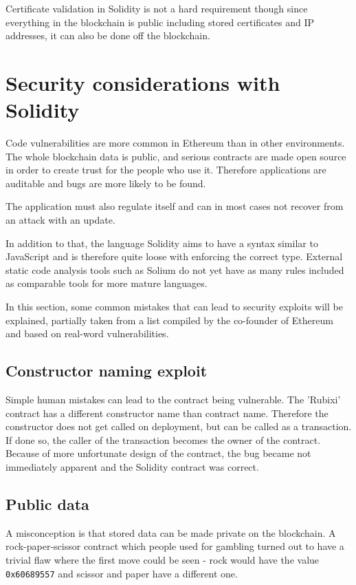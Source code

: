 Certificate validation in Solidity is not a hard requirement though \textemdash{} since everything in the blockchain is public including stored certificates and IP addresses, it can also be done off the blockchain. 

\section{Security considerations with Solidity}
Code vulnerabilities are more common in Ethereum than in other environments. The whole blockchain data is public, and serious contracts are made open source in order to create trust for the people who use it. Therefore applications are auditable and bugs are more likely to be found.

The application must also regulate itself and can in most cases not recover from an attack with an update.

In addition to that, the language Solidity aims to have a syntax similar to JavaScript and is therefore quite loose with enforcing the correct type. External static code analysis tools such as Solium \cite{Solium} do not yet have as many rules included as comparable tools for more mature languages.

In this section, some common mistakes that can lead to security exploits will be explained, partially taken from a list compiled by the co-founder of Ethereum \cite{ThinkingAboutSmartContractSecurity} and based on real-word vulnerabilities.

\subsection{Constructor naming exploit}
Simple human mistakes can lead to the contract being vulnerable. The 'Rubixi' contract has a different constructor name than contract name. Therefore the constructor does not get called on deployment, but can be called as a transaction. If done so, the caller of the transaction becomes the owner of the contract. Because of more unfortunate design of the contract, the bug became not immediately apparent and the Solidity contract was correct.



\subsection{Public data}
A misconception is that stored data can be made private on the blockchain. A rock-paper-scissor contract which people used for gambling turned out to have a trivial flaw where the first move could be seen - rock would have the value \texttt{0x60689557} and scissor and paper have a different one.

